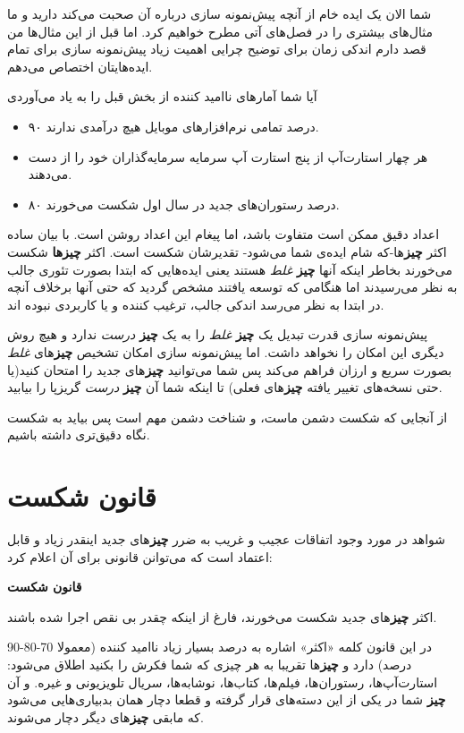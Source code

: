 شما الان یک ایده خام از آنچه پیش‌نمونه سازی درباره آن صحبت می‌کند دارید
و ما مثال‌های بیشتری را در فصل‌های آتی مطرح خواهیم کرد. اما قبل از این
مثال‌ها من قصد دارم اندکی زمان برای توضیح چرایی اهمیت زیاد پیش‌نمونه
سازی برای تمام ایده‌هایتان اختصاص می‌دهم.

آیا شما آمارهای ناامید کننده از بخش قبل را به یاد می‌آوردی

\begin{itemize}

\item
  ۹۰ درصد تمامی نرم‌افزارهای موبایل هیچ درآمدی ندارند.
\item
  هر چهار استارت‌آپ از پنج استارت آپ سرمایه سرمایه‌گذاران خود را از دست
  می‌دهند.
\item
  ۸۰ درصد رستوران‌های جدید در سال اول شکست می‌خورند.
\end{itemize}

اعداد دقیق ممکن است متفاوت باشد، اما پیغام این اعداد روشن است. با بیان
ساده اکثر \textbf{چیز}ها-که شام ایده‌ی شما می‌شود- تقدیرشان شکست است.
اکثر \textbf{چیزها} شکست می‌خورند بخاطر اینکه آنها \textbf{چیز}
\emph{غلط} هستند یعنی ایده‌هایی که ابتدا بصورت تئوری جالب به نظر
می‌رسیدند اما هنگامی که توسعه یافتند مشخص گردید که حتی آنها برخلاف آنچه
در ابتدا به نظر می‌رسد اندکی جالب، ترغیب کننده و یا کاربردی نبوده اند.

پیش‌نمونه سازی قدرت تبدیل یک \textbf{چیز} \emph{غلط} را به یک
\textbf{چیز} \emph{درست} ندارد و هیچ روش دیگری این امکان را نخواهد داشت.
اما پیش‌نمونه سازی امکان تشخیص \textbf{چیز}های \emph{غلط} بصورت سریع و
ارزان فراهم می‌کند پس شما می‌توانید \textbf{چیز}های جدید را امتحان
کنید(یا حتی نسخه‌های تغییر یافته \textbf{چیز}های فعلی) تا اینکه شما آن
\textbf{چیز} \emph{درست} گریزپا را بیابید.

از آنجایی که شکست دشمن ماست، و شناخت دشمن مهم است پس بیاید به شکست نگاه
دقیق‌تری داشته باشیم.

\section{قانون
شکست}\label{ux642ux627ux646ux648ux646-ux634ux6a9ux633ux62a}

شواهد در مورد وجود اتفاقات عجیب و غریب به ضرر \textbf{چیز}های جدید
اینقدر زیاد و قابل اعتماد است که می‌توانن قانونی برای آن اعلام کرد:

\textbf{قانون شکست}

اکثر \textbf{چیز}های جدید شکست می‌خورند، فارغ از اینکه چقدر بی نقص اجرا
شده باشند.

در این قانون کلمه «اکثر» اشاره به درصد بسیار زیاد ناامید کننده (معمولا
70-80-90 درصد) دارد و \textbf{چیز}ها تقریبا به هر چیزی که شما فکرش را
بکنید اطلاق می‌شود: استارت‌آپ‌ها، رستوران‌ها، فیلم‌ها، کتاب‌ها،
نوشابه‌ها، سریال تلویزیونی و غیره. و آن \textbf{چیز} شما در یکی از این
دسته‌های قرار گرفته و قطعا دچار همان بدبیاری‌هایی می‌شود که مابقی
\textbf{چیز}های دیگر دچار می‌شوند.

